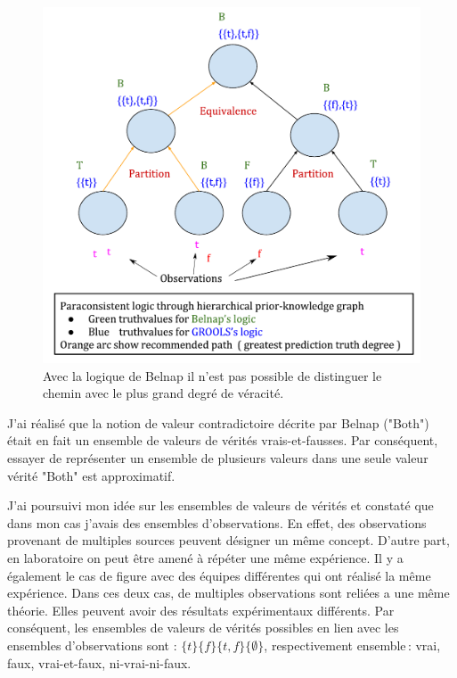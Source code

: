 \begin{refsegment}
\begin{shadedfigure}[H]
\begin{subfigure}[t]{.48\textwidth}
		\includegraphics[width=\textwidth]{img/GROOLS_vs_belnap_2.pdf}
		\caption{Avec la logique de Belnap il n'est pas possible de distinguer le chemin avec le plus grand degré de véracité. }
		\label{fig:grools_belnap_2}
	\end{subfigure}
	\label{fig:grools_belnap}
\end{shadedfigure}

J'ai réalisé que la notion de valeur contradictoire décrite par Belnap ("Both") était en fait un ensemble de valeurs de vérités vrais-et-fausses. Par conséquent, essayer de représenter un ensemble de plusieurs valeurs dans une seule valeur vérité "Both" est approximatif.

J'ai poursuivi mon idée sur les ensembles de valeurs de vérités et constaté que dans mon cas j'avais des ensembles d'observations. En effet, des observations provenant de multiples sources peuvent désigner un même concept. D'autre part, en laboratoire on peut être amené à répéter une même expérience. Il y a également le cas de figure avec des équipes différentes qui ont réalisé la même expérience. Dans ces deux cas, de multiples observations sont reliées a une même théorie. Elles peuvent avoir des résultats expérimentaux différents. Par conséquent, les ensembles de valeurs de vérités possibles en lien avec les ensembles d'observations sont : $\{t\} \{f\} \{t,f\} \{\emptyset\}$, respectivement ensemble : vrai, faux, vrai-et-faux, ni-vrai-ni-faux. 


\end{refsegment}
